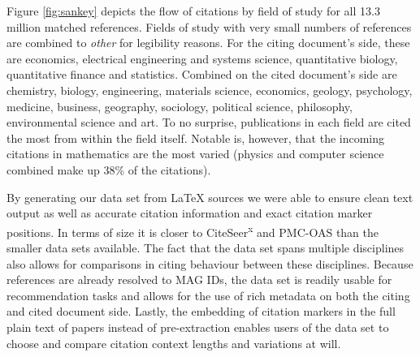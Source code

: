 Figure \ref{fig:sankey} depicts the flow of citations by field of study for all 13.3 million matched references. Fields of study with very small numbers of references are combined to \emph{other} for legibility reasons. For the citing document's side, these are economics, electrical engineering and systems science, quantitative biology, quantitative finance and statistics. Combined on the cited document's side are chemistry, biology, engineering, materials science, economics, geology, psychology, medicine, business, geography, sociology, political science, philosophy, environmental science and art. To no surprise, publications in each field are cited the most from within the field itself. Notable is, however, that the incoming citations in mathematics are the most varied (physics and computer science combined make up 38\% of the citations).

By generating our data set from \LaTeX{} sources we were able to ensure clean text output as well as accurate citation information and exact citation marker positions. In terms of size it is closer to CiteSeer\textsuperscript{x} and PMC-OAS than the smaller data sets available. The fact that the data set spans multiple disciplines also allows for comparisons in citing behaviour between these disciplines. Because references are already resolved to MAG IDs, the data set is readily usable for recommendation tasks and allows for the use of rich metadata on both the citing and cited document side. Lastly, the embedding of citation markers in the full plain text of papers instead of pre-extraction enables users of the data set to choose and compare citation context lengths and variations at will.
